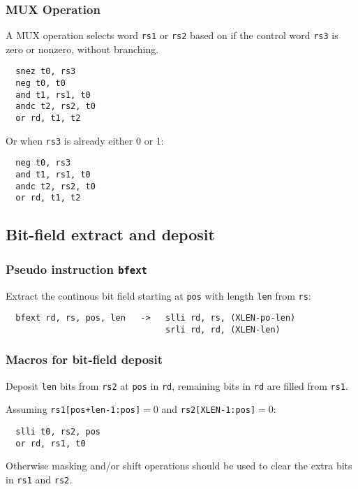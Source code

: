 \subsubsection{MUX Operation}

A MUX operation selects word {\tt rs1} or {\tt rs2} based on if the control
word {\tt rs3} is zero or nonzero, without branching.

\begin{verbatim}
  snez t0, rs3
  neg t0, t0
  and t1, rs1, t0
  andc t2, rs2, t0
  or rd, t1, t2
\end{verbatim}

Or when {\tt rs3} is already either 0 or 1:

\begin{verbatim}
  neg t0, rs3
  and t1, rs1, t0
  andc t2, rs2, t0
  or rd, t1, t2
\end{verbatim}

\subsection{Bit-field extract and deposit}

\subsubsection{Pseudo instruction {\tt bfext}}

Extract the continous bit field starting at {\tt pos} with length {\tt len}
from {\tt rs}:

\begin{verbatim}
  bfext rd, rs, pos, len   ->   slli rd, rs, (XLEN-po-len)
                                srli rd, rd, (XLEN-len)
\end{verbatim}

\subsubsection{Macros for bit-field deposit}

Deposit {\tt len} bits from {\tt rs2} at {\tt pos} in {\tt rd}, remaining bits
in {\tt rd} are filled from {\tt rs1}.

Assuming {\tt rs1[pos+len-1:pos]}$=$0 and {\tt rs2[XLEN-1:pos]}$=$0:

\begin{verbatim}
  slli t0, rs2, pos
  or rd, rs1, t0
\end{verbatim}

Otherwise masking and/or shift operations should be used to clear the extra
bits in {\tt rs1} and {\tt rs2}.

